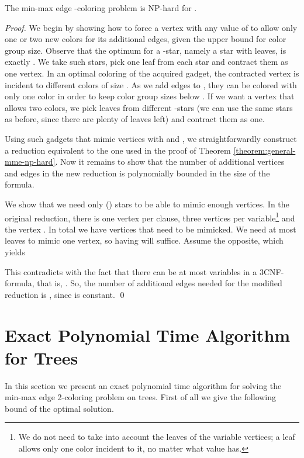 \documentclass[runningheads, a4paper]{llncs}
\begin{document}
\begin{theorem}
The min-max edge -coloring problem is NP-hard for .
\end{theorem}
\begin{proof}
We begin by showing how to force a vertex with any value of  to allow only one or two new colors for its additional edges, given the upper bound  for color group size. Observe that the optimum for a -star, namely a star with  leaves, is exactly . We take  such stars, pick one leaf from each star and contract them as one vertex. In an optimal coloring of the acquired gadget, the contracted vertex  is incident to  different colors of size . As we add edges to , they can be colored with only one color in order to keep color group sizes below . If we want a vertex that allows two colors, we pick  leaves from different -stars (we can use the same stars as before, since there are plenty of leaves left) and contract them as one.

Using such gadgets that mimic vertices with  and , we straightforwardly construct a reduction equivalent to the one used in the proof of Theorem \ref{theorem:general-mme-np-hard}. Now it remains to show that the number of additional vertices and edges in the new reduction is polynomially bounded in the size of the formula.

We show that we need only () stars to be able to mimic enough vertices. In the original reduction, there is one vertex per clause, three vertices per variable\footnote{We do not need to take into account the leaves of the variable vertices; a leaf allows only one color incident to it, no matter what value  has.} and the vertex . In total we have  vertices that need to be mimicked. We need at most  leaves to mimic one vertex, so having  will suffice. Assume the opposite, which yields

This contradicts with the fact that there can be at most  variables in a 3CNF-formula, that is, . So, the number of additional edges needed for the modified reduction is , since  is constant. \qed
\end{proof}


\section{Exact Polynomial Time Algorithm for Trees}\label{sect:polytree}

In this section we present an exact polynomial time algorithm for solving the min-max edge 2-coloring problem on trees. First of all we give the following bound of the optimal solution.
\end{document}
